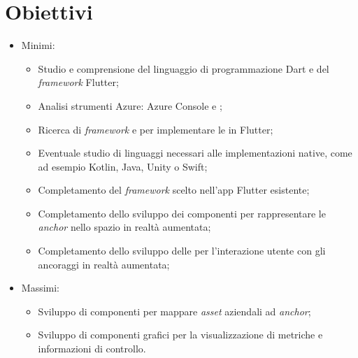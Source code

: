 \section{Obiettivi}
\begin{itemize}
    \item Minimi:
        \begin{itemize}
            \item Studio e comprensione del linguaggio di programmazione Dart e del \textit{framework} Flutter;
            \item Analisi strumenti Azure: Azure Console e \asa{};
            \item Ricerca di \textit{framework} e \sdk{} per implementare le \asa{} in Flutter;
            \item Eventuale studio di linguaggi necessari alle implementazioni native, come ad esempio Kotlin, Java, Unity o Swift;
            \item Completamento del \textit{framework} scelto nell'app Flutter esistente;
            \item Completamento dello sviluppo dei componenti per rappresentare le \textit{anchor} nello spazio in realtà aumentata;
            \item Completamento dello sviluppo delle \api{} per l'interazione utente con gli ancoraggi in realtà aumentata;
        \end{itemize}
    \item Massimi: 
        \begin{itemize}
            \item Sviluppo di componenti per mappare \textit{asset} aziendali ad \textit{anchor};
            \item Sviluppo di componenti grafici per la visualizzazione di metriche e informazioni di controllo.
        \end{itemize}
\end{itemize}

